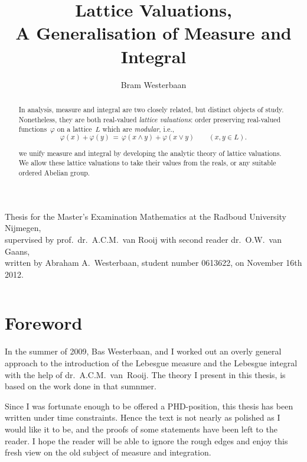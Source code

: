 \documentclass[main.tex]{subfiles}
\begin{document}
\title[A Generalisation of Measure and Integral]{Lattice Valuations,\\
A Generalisation of Measure and Integral}

\author[A.A.~Westerbaan]{Bram Westerbaan}
\maketitle


\vspace{1cm}


\vfill
\noindent
{\tiny
Thesis for the Master's Examination
Mathematics at the Radboud University Nijmegen,\\
supervised by prof.~dr.~A.C.M.~van Rooij
with second reader dr.~O.W.~van Gaans,\\
written by Abraham A.~Westerbaan, 
student number 0613622,
on November 16th 2012.

}
\clearpage
$\,$
\newpage
\begin{abstract}
In analysis,
measure and integral are two closely related,
but distinct objects of study.
Nonetheless,
they are both real-valued \emph{lattice valuations}:
order preserving real-valued functions~$\varphi$
on a lattice~$L$
which are \emph{modular}, i.e.,
\begin{equation*}
\varphi(x) + \varphi(y) 
\,=\, 
\varphi(x\wedge y) + \varphi(x\vee y)\qquad(x,y\in L).
\end{equation*}

we unify measure and integral
by developing the analytic theory of lattice valuations.
We allow these lattice valuations
to take their values from the reals,
or any suitable ordered Abelian group.
\end{abstract}

\clearpage
%
%
\section*{Foreword}
In the summer of 2009, Bas Westerbaan,
and I worked out an 
overly general approach
to the introduction of the Lebesgue measure and the Lebesgue integral
with the help of dr.~A.C.M.~van~Rooij.
The theory I present in this thesis,
is based on the work done in that sumnmer.

Since I was fortunate enough to be offered
a PHD-position,
this thesis has been written under time constraints.
Hence the text is not nearly as polished as 
I would like it to be,
and the proofs of some statements
have been left to the reader.
I hope the reader will be able to ignore the rough edges
and enjoy this fresh view on the old subject
of measure and integration.
\end{document}
